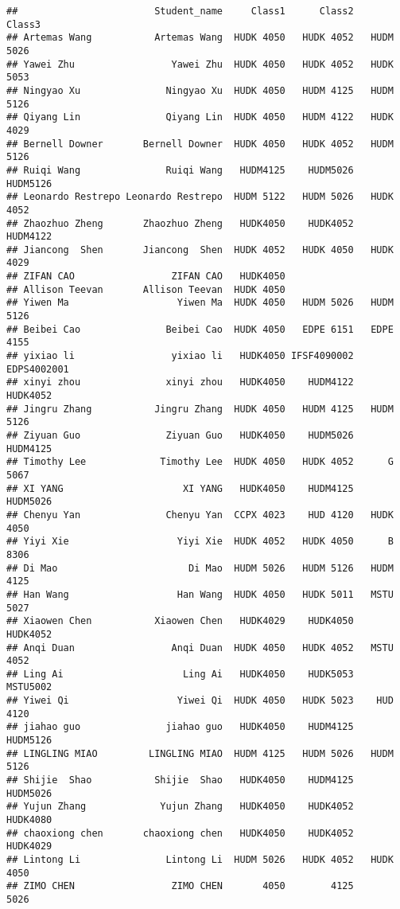 \documentclass[]{article}
\begin{document}
\begin{verbatim}
##                        Student_name     Class1      Class2      Class3
## Artemas Wang           Artemas Wang  HUDK 4050   HUDK 4052   HUDM 5026
## Yawei Zhu                 Yawei Zhu  HUDK 4050   HUDK 4052   HUDK 5053
## Ningyao Xu               Ningyao Xu  HUDK 4050   HUDM 4125   HUDM 5126
## Qiyang Lin               Qiyang Lin  HUDK 4050   HUDM 4122   HUDK 4029
## Bernell Downer       Bernell Downer  HUDK 4050   HUDK 4052   HUDM 5126
## Ruiqi Wang               Ruiqi Wang   HUDM4125    HUDM5026    HUDM5126
## Leonardo Restrepo Leonardo Restrepo  HUDM 5122   HUDM 5026   HUDK 4052
## Zhaozhuo Zheng       Zhaozhuo Zheng   HUDK4050    HUDK4052    HUDM4122
## Jiancong  Shen       Jiancong  Shen  HUDK 4052   HUDK 4050   HUDK 4029
## ZIFAN CAO                 ZIFAN CAO   HUDK4050                        
## Allison Teevan       Allison Teevan  HUDK 4050                        
## Yiwen Ma                   Yiwen Ma  HUDK 4050   HUDM 5026   HUDM 5126
## Beibei Cao               Beibei Cao  HUDK 4050   EDPE 6151   EDPE 4155
## yixiao li                 yixiao li   HUDK4050 IFSF4090002 EDPS4002001
## xinyi zhou               xinyi zhou   HUDK4050    HUDM4122    HUDK4052
## Jingru Zhang           Jingru Zhang  HUDK 4050   HUDM 4125   HUDM 5126
## Ziyuan Guo               Ziyuan Guo   HUDK4050    HUDM5026    HUDM4125
## Timothy Lee             Timothy Lee  HUDK 4050   HUDK 4052      G 5067
## XI YANG                     XI YANG   HUDK4050    HUDM4125    HUDM5026
## Chenyu Yan               Chenyu Yan  CCPX 4023    HUD 4120   HUDK 4050
## Yiyi Xie                   Yiyi Xie  HUDK 4052   HUDK 4050      B 8306
## Di Mao                       Di Mao  HUDM 5026   HUDM 5126   HUDM 4125
## Han Wang                   Han Wang  HUDK 4050   HUDK 5011   MSTU 5027
## Xiaowen Chen           Xiaowen Chen   HUDK4029    HUDK4050    HUDK4052
## Anqi Duan                 Anqi Duan  HUDK 4050   HUDK 4052   MSTU 4052
## Ling Ai                     Ling Ai   HUDK4050    HUDK5053    MSTU5002
## Yiwei Qi                   Yiwei Qi  HUDK 4050   HUDK 5023    HUD 4120
## jiahao guo               jiahao guo   HUDK4050    HUDM4125    HUDM5126
## LINGLING MIAO         LINGLING MIAO  HUDM 4125   HUDM 5026   HUDM 5126
## Shijie  Shao           Shijie  Shao   HUDK4050    HUDM4125    HUDM5026
## Yujun Zhang             Yujun Zhang   HUDK4050    HUDK4052    HUDK4080
## chaoxiong chen       chaoxiong chen   HUDK4050    HUDK4052    HUDK4029
## Lintong Li               Lintong Li  HUDM 5026   HUDK 4052   HUDK 4050
## ZIMO CHEN                 ZIMO CHEN       4050        4125        5026

\end{verbatim}
\end{document}
